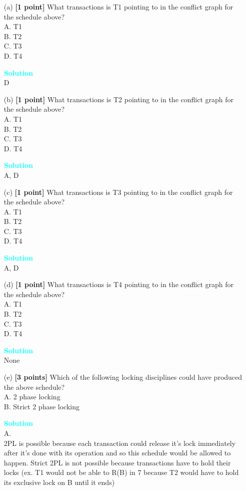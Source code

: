 \documentclass[10pt]{article}
\newenvironment{solution}
    { \begin{mdframed}[backgroundcolor=gray!10] \textcolor{cyan}{\textbf{Solution}} \\}
    {  \end{mdframed}}
\begin{document}
\begin{itemize}
	\item[(a)] \textbf{[1 point]} What transactions is T1 pointing to in the conflict graph for the schedule above?\\
	      A. T1\\
	      B. T2\\
	      C. T3\\
	      D. T4
	      \begin{solution}
		      D
	      \end{solution}

	\item[(b)] \textbf{[1 point]} What transactions is T2 pointing to in the conflict graph for the schedule above?\\
	      A. T1\\
	      B. T2\\
	      C. T3\\
	      D. T4
	      \begin{solution}
		      A, D
	      \end{solution}

	\item[(c)] \textbf{[1 point]} What transactions is T3 pointing to in the conflict graph for the schedule above? \\
	      A. T1\\
	      B. T2\\
	      C. T3\\
	      D. T4
	      \begin{solution}
		      A, D
	      \end{solution}

	\item[(d)] \textbf{[1 point]} What transactions is T4 pointing to in the conflict graph for the schedule above? \\
	      A. T1\\
	      B. T2\\
	      C. T3\\
	      D. T4
	      \begin{solution}
		      None
	      \end{solution}

	\item[(e)] \textbf{[3 points]} Which of the following locking disciplines could have produced the above schedule?\\
	      A. 2 phase locking\\
	      B. Strict 2 phase locking
	      \begin{solution}
		      A.\\
		      2PL is possible because each transaction could release it’s lock immediately after
		      it’s done with its operation and so this schedule would be allowed to happen. Strict 2PL is not possible because transactions have to hold their locks (ex. T1 would not be able to R(B) in 7 because T2 would have to hold its exclusive lock on B until it ends)
	      \end{solution}


\end{itemize}
\end{document}

